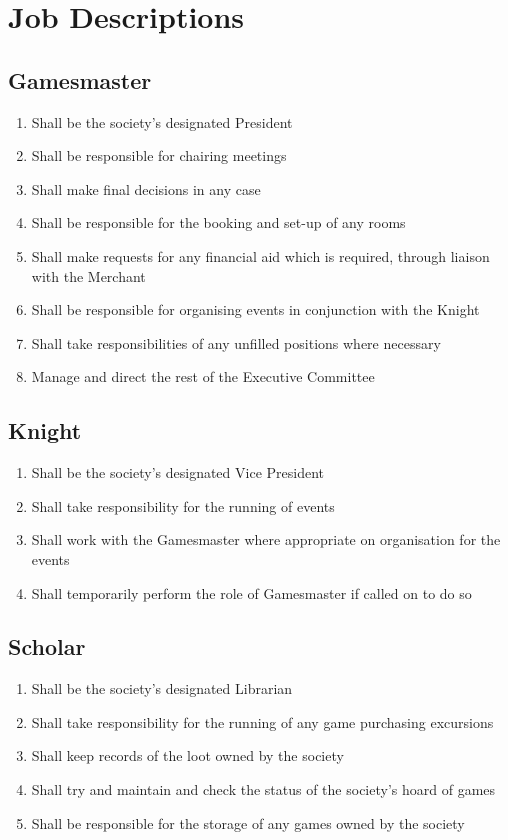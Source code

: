 \documentclass[hidelinks, 12pt, a4paper]{article}
\begin{document}
\section{Job Descriptions}
\subsection{Gamesmaster}
\begin{enumerate}
\item Shall be the society’s designated President
\item Shall be responsible for chairing meetings
\item Shall make final decisions in any case
\item Shall be responsible for the booking and set-up of any rooms 
\item Shall make requests for any financial aid which is required, through liaison with the Merchant
\item Shall be responsible for organising events in conjunction with the Knight
\item Shall take responsibilities of any unfilled positions where necessary
\item Manage and direct the rest of the Executive Committee
\end{enumerate}

\subsection{Knight}
\begin{enumerate}
	\item Shall be the society’s designated Vice President
	\item Shall take responsibility for the running of events
	\item Shall work with the Gamesmaster where appropriate on organisation for the events
	\item Shall temporarily perform the role of Gamesmaster if called on to do so
\end{enumerate}

\subsection{Scholar}
\begin{enumerate}
	\item Shall be the society’s designated Librarian
	\item Shall take responsibility for the running of any game purchasing excursions
	\item Shall keep records of the loot owned by the society
	\item Shall try and maintain and check the status of the society’s hoard of games
	\item Shall be responsible for the storage of any games owned by the society
\end{enumerate}
\end{document}
